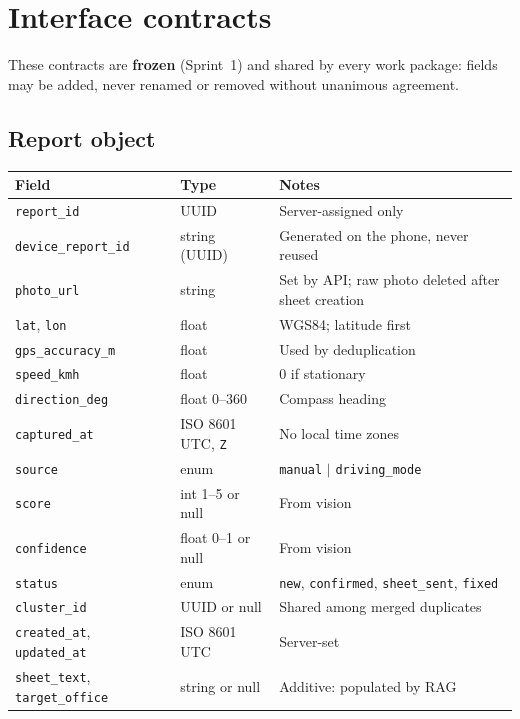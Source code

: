 \documentclass[11pt,a4paper,oneside]{report}
\begin{document}
\chapter{Interface contracts}
These contracts are \textbf{frozen} (Sprint~1) and shared by every work package: fields may be added, never
renamed or removed without unanimous agreement.

\section{Report object}
\begin{longtable}{@{}L{3.6cm}L{3.8cm}L{6.6cm}@{}}
\toprule\textbf{Field} & \textbf{Type} & \textbf{Notes}\\\midrule\endhead
\texttt{report\_id} & UUID & Server-assigned only\\
\texttt{device\_report\_id} & string (UUID) & Generated on the phone, never reused\\
\texttt{photo\_url} & string & Set by API; raw photo deleted after sheet creation\\
\texttt{lat}, \texttt{lon} & float & WGS84; latitude first\\
\texttt{gps\_accuracy\_m} & float & Used by deduplication\\
\texttt{speed\_kmh} & float & 0 if stationary\\
\texttt{direction\_deg} & float 0--360 & Compass heading\\
\texttt{captured\_at} & ISO 8601 UTC, \texttt{Z} & No local time zones\\
\texttt{source} & enum & \texttt{manual} $|$ \texttt{driving\_mode}\\
\texttt{score} & int 1--5 or null & From vision\\
\texttt{confidence} & float 0--1 or null & From vision\\
\texttt{status} & enum & \texttt{new}, \texttt{confirmed}, \texttt{sheet\_sent}, \texttt{fixed}\\
\texttt{cluster\_id} & UUID or null & Shared among merged duplicates\\
\texttt{created\_at}, \texttt{updated\_at} & ISO 8601 UTC & Server-set\\
\texttt{sheet\_text}, \texttt{target\_office} & string or null & Additive: populated by RAG\\\bottomrule
\end{longtable}
\end{document}
